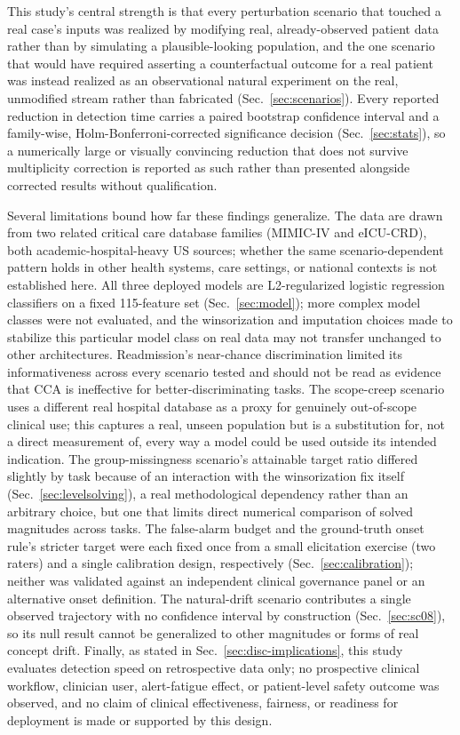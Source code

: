 \documentclass[preprintsapa,article,submit,oneauthor]{Definitions/mdpi}
\begin{document}
This study's central strength is that every perturbation scenario that touched a real case's inputs was realized by modifying real, already-observed patient data rather than by simulating a plausible-looking population, and the one scenario that would have required asserting a counterfactual outcome for a real patient was instead realized as an observational natural experiment on the real, unmodified stream rather than fabricated (Sec.~\ref{sec:scenarios}). Every reported reduction in detection time carries a paired bootstrap confidence interval and a family-wise, Holm-Bonferroni-corrected significance decision (Sec.~\ref{sec:stats}), so a numerically large or visually convincing reduction that does not survive multiplicity correction is reported as such rather than presented alongside corrected results without qualification.

Several limitations bound how far these findings generalize. The data are drawn from two related critical care database families (MIMIC-IV and eICU-CRD), both academic-hospital-heavy US sources; whether the same scenario-dependent pattern holds in other health systems, care settings, or national contexts is not established here. All three deployed models are L2-regularized logistic regression classifiers on a fixed 115-feature set (Sec.~\ref{sec:model}); more complex model classes were not evaluated, and the winsorization and imputation choices made to stabilize this particular model class on real data may not transfer unchanged to other architectures. Readmission's near-chance discrimination limited its informativeness across every scenario tested and should not be read as evidence that CCA is ineffective for better-discriminating tasks. The scope-creep scenario uses a different real hospital database as a proxy for genuinely out-of-scope clinical use; this captures a real, unseen population but is a substitution for, not a direct measurement of, every way a model could be used outside its intended indication. The group-missingness scenario's attainable target ratio differed slightly by task because of an interaction with the winsorization fix itself (Sec.~\ref{sec:levelsolving}), a real methodological dependency rather than an arbitrary choice, but one that limits direct numerical comparison of solved magnitudes across tasks. The false-alarm budget and the ground-truth onset rule's stricter target were each fixed once from a small elicitation exercise (two raters) and a single calibration design, respectively (Sec.~\ref{sec:calibration}); neither was validated against an independent clinical governance panel or an alternative onset definition. The natural-drift scenario contributes a single observed trajectory with no confidence interval by construction (Sec.~\ref{sec:sc08}), so its null result cannot be generalized to other magnitudes or forms of real concept drift. Finally, as stated in Sec.~\ref{sec:disc-implications}, this study evaluates detection speed on retrospective data only; no prospective clinical workflow, clinician user, alert-fatigue effect, or patient-level safety outcome was observed, and no claim of clinical effectiveness, fairness, or readiness for deployment is made or supported by this design.
\end{document}
